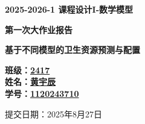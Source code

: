 
\newcommand{\covertitle}[1]{\begin{center}\Huge\bfseries #1\end{center}}
\newcommand{\coversubtitle}[1]{\begin{center}\Large\bfseries #1\end{center}}
\newcommand{\coverinfo}[1]{\begin{center}\large #1\end{center}}


\thispagestyle{empty} 
\begin{center}
\vspace*{2cm}


\covertitle{2025-2026-1 课程设计I-数学模型}
\vspace{1cm} %

\coversubtitle{第一次大作业报告}
\vspace{1.5cm} %

\covertitle{基于不同模型的卫生资源预测与配置}
\vspace{3cm} %

\begin{flushleft}
\large\bfseries 
班级：\underline{2417} \\[0.8cm] %
姓名：\underline{黄宇辰} \\[0.8cm]
学号：\underline{1120243710} \\[0.8cm]
\end{flushleft}

\vfill %
\coverinfo{提交日期：2025年8月27日} %
\end{center}
\newpage